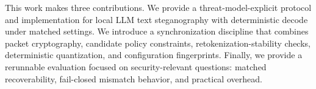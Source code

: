 This work makes three contributions. We provide a threat-model-explicit protocol and implementation for local LLM text steganography with deterministic decode under matched settings. We introduce a synchronization discipline that combines packet cryptography, candidate policy constraints, retokenization-stability checks, deterministic quantization, and configuration fingerprints. Finally, we provide a rerunnable evaluation focused on security-relevant questions: matched recoverability, fail-closed mismatch behavior, and practical overhead.
